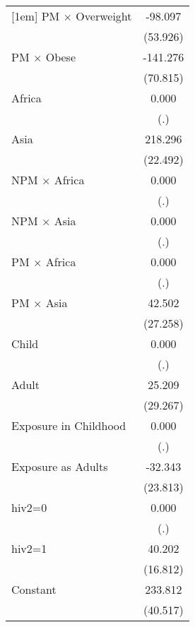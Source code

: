\begin{table}[htbp]
\begin{tabular}{l*{1}{c}}
[1em]
PM $\times$ Overweight&     -98.097         \\
                    &    (53.926)         \\
[1em]
PM $\times$ Obese   &    -141.276\sym{*}  \\
                    &    (70.815)         \\
[1em]
Africa              &       0.000         \\
                    &         (.)         \\
[1em]
Asia                &     218.296\sym{***}\\
                    &    (22.492)         \\
[1em]
NPM $\times$ Africa &       0.000         \\
                    &         (.)         \\
[1em]
NPM $\times$ Asia   &       0.000         \\
                    &         (.)         \\
[1em]
PM $\times$ Africa  &       0.000         \\
                    &         (.)         \\
[1em]
PM $\times$ Asia    &      42.502         \\
                    &    (27.258)         \\
[1em]
Child               &       0.000         \\
                    &         (.)         \\
[1em]
Adult               &      25.209         \\
                    &    (29.267)         \\
[1em]
Exposure in Childhood&       0.000         \\
                    &         (.)         \\
[1em]
Exposure as Adults  &     -32.343         \\
                    &    (23.813)         \\
[1em]
hiv2=0              &       0.000         \\
                    &         (.)         \\
[1em]
hiv2=1              &      40.202\sym{*}  \\
                    &    (16.812)         \\
[1em]
Constant            &     233.812\sym{***}\\
                    &    (40.517)         \\

\end{tabular}
\end{table}
